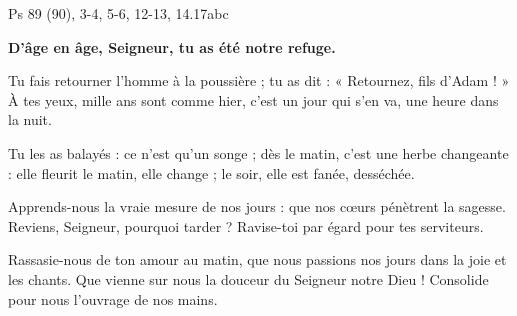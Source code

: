 Ps 89 (90), 3-4, 5-6, 12-13, 14.17abc

\textbf{
D’âge en âge, Seigneur,
tu as été notre refuge.
}

\smallskip

Tu fais retourner l’homme à la poussière ;
tu as dit : « Retournez, fils d’Adam ! »
À tes yeux, mille ans sont comme hier,
c’est un jour qui s’en va, une heure dans la nuit.

\smallskip

Tu les as balayés : ce n’est qu’un songe ;
dès le matin, c’est une herbe changeante :
elle fleurit le matin, elle change ;
le soir, elle est fanée, desséchée.

\smallskip

Apprends-nous la vraie mesure de nos jours :
que nos cœurs pénètrent la sagesse.
Reviens, Seigneur, pourquoi tarder ?
Ravise-toi par égard pour tes serviteurs.

\smallskip

Rassasie-nous de ton amour au matin,
que nous passions nos jours dans la joie et les chants.
Que vienne sur nous la douceur du Seigneur notre Dieu !
Consolide pour nous l’ouvrage de nos mains.

